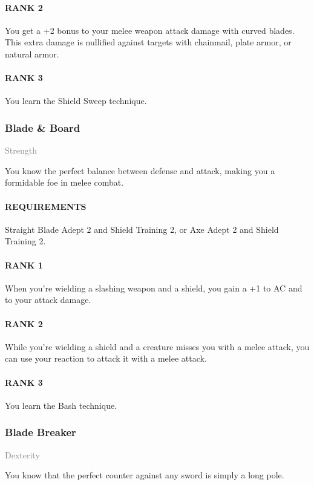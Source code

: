 \paragraph{RANK 2} You get a +2 bonus to your melee weapon attack damage with curved blades.
This extra damage is nullified against targets with chainmail, plate armor, or natural armor.
\paragraph{RANK 3} You learn the Shield Sweep technique.

\subsubsection{Blade \& Board} \label{tal::bladeandboard}
\small{\textcolor{gray}{Strength}}

\normalsize
You know the perfect balance between defense and attack, making you a formidable foe in melee combat.
\paragraph{REQUIREMENTS} Straight Blade Adept 2 and Shield Training 2, or Axe Adept 2 and Shield Training 2.
\paragraph{RANK 1} When you're wielding a slashing weapon and a shield, you gain a +1 to AC and to your attack damage.
\paragraph{RANK 2} While you're wielding a shield and a creature misses you with a melee attack, you can use your reaction to attack it with a melee attack.
\paragraph{RANK 3} You learn the Bash technique.

\subsubsection{Blade Breaker} \label{tal::bladebreaker}
\small{\textcolor{gray}{Dexterity}}

\normalsize
You know that the perfect counter against any sword is simply a long pole.
